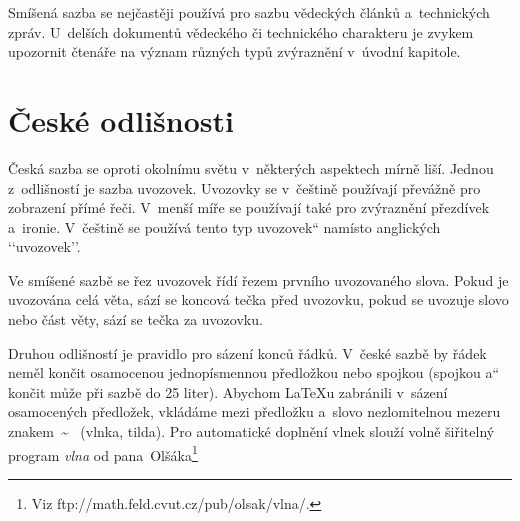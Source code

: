 \documentclass[11pt, a4paper, twocolumn]{article}
\providecommand{\uv}[1]{\quotedblbase #1\textquotedblleft}
\begin{document}
Smíšená sazba se nejčastěji používá pro sazbu vě\-deckých článků a~technických zpráv. U~delších dokumentů vědeckého či technického charakteru je zvykem upozornit čtenáře na význam různých typů zvýraznění v~úvodní kapitole.

\section{České odlišnosti}

Česká sazba se oproti okolnímu světu v~některých aspektech mírně liší. Jednou z~odlišností je sazba uvo\-zovek. Uvozovky se v~češtině používají převážně pro zobrazení přímé řeči. V~menší míře se používají také pro zvýraznění přezdívek a~ironie. V~češtině se použí\-vá tento \uv{typ uvozovek} namísto anglických ‘‘uvozo\-vek’’.

Ve smíšené sazbě se řez uvozovek řídí řezem první\-ho uvozovaného slova. Pokud je uvozována celá věta, sází se koncová tečka před uvozovku, pokud se uvo\-zuje slovo nebo část věty, sází se tečka za uvozovku.

Druhou odlišností je pravidlo pro sázení konců řádků. V~české sazbě by řádek neměl končit osamoce\-nou jednopísmennou předložkou nebo spojkou (spoj\-kou \uv{a} končit může při sazbě do 25 liter). Abychom \LaTeX u zabránili v~sázení osamocených předložek, vkládáme mezi předložku a~slovo nezlomitelnou me\-zeru znakem~\~ ~(vlnka, tilda). Pro automatické do\-plnění vlnek slouží volně šiřitelný program \textit{vlna} od pana~Olšáka\footnote{Viz ftp://math.feld.cvut.cz/pub/olsak/vlna/.}
\end{document}
